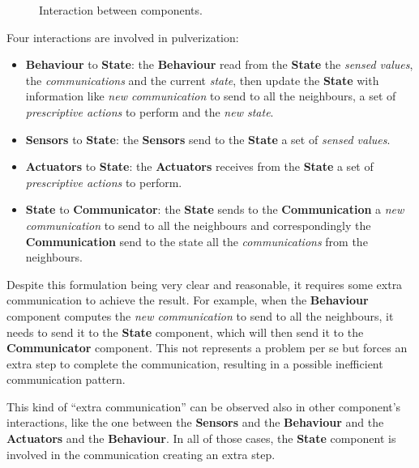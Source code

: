 \begin{figure}
	\centering
	\caption{Interaction between components.}
	\label{fig:framework-components-interaction}
\end{figure}

Four interactions are involved in pulverization:
\begin{itemize}
	\item \textbf{Behaviour} to \textbf{State}: the \textbf{Behaviour} read from the \textbf{State} the \textit{sensed values}, the \textit
	      {communications} and the current \textit{state}, then update the \textbf{State} with information like \textit{new communication} to send to
	      all the neighbours, a set of \textit{prescriptive actions} to perform and the \textit{new state}.
	\item \textbf{Sensors} to \textbf{State}: the \textbf{Sensors} send to the \textbf{State} a set of \textit{sensed values}.
	\item \textbf{Actuators} to \textbf{State}: the \textbf{Actuators} receives from the \textbf{State} a set of \textit{prescriptive actions} to
	      perform.
	\item \textbf{State} to \textbf{Communicator}: the \textbf{State} sends to the \textbf{Communication} a \textit{new communication}
	      to send to all the neighbours and correspondingly the \textbf{Communication} send to the state all the \textit{communications} from the
	      neighbours.
\end{itemize}


Despite this formulation being very clear and reasonable, it requires some extra communication to achieve the result.
For example, when the \textbf{Behaviour} component computes the \textit{new communication} to send to all the neighbours, it needs to send it to the
\textbf{State} component, which will then send it to the \textbf{Communicator} component. This not represents a problem per se but forces an extra
step to complete the communication, resulting in a possible inefficient communication pattern.

This kind of ``extra communication'' can be observed also in other component's interactions, like the one between the \textbf{Sensors} and the
\textbf{Behaviour} and the \textbf{Actuators} and the \textbf{Behaviour}. In all of those cases, the \textbf{State} component is involved in the
communication creating an extra step.

